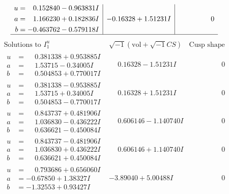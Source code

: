 \documentclass[1p]{elsarticle_modified}
\theoremstyle{definition}
\newcommand{\I}{\sqrt{-1}}
\begin{document}
$$\begin{array}{c|c|c}
\begin{aligned}
u &= \phantom{-}0.152840 - 0.963831 I \\
a &= \phantom{-}1.166230 + 0.182836 I \\
b &= -0.463762 - 0.579118 I\end{aligned}
 & -0.16328 + 1.51231 I & \phantom{-0.000000 } 0\\
 \hline 
 \end{array}$$\newpage$$\begin{array}{c|c|c}  
\text{Solutions to }I^u_{1}& \I (\text{vol} + \sqrt{-1}CS) & \text{Cusp shape}\\
 \hline 
\begin{aligned}
u &= \phantom{-}0.381338 + 0.953885 I \\
a &= \phantom{-}1.53715 - 0.34005 I \\
b &= \phantom{-}0.504853 + 0.770017 I\end{aligned}
 & \phantom{-}0.16328 - 1.51231 I & \phantom{-0.000000 } 0 \\ \hline\begin{aligned}
u &= \phantom{-}0.381338 - 0.953885 I \\
a &= \phantom{-}1.53715 + 0.34005 I \\
b &= \phantom{-}0.504853 - 0.770017 I\end{aligned}
 & \phantom{-}0.16328 + 1.51231 I & \phantom{-0.000000 } 0 \\ \hline\begin{aligned}
u &= \phantom{-}0.843737 + 0.481906 I \\
a &= \phantom{-}1.036830 - 0.436222 I \\
b &= \phantom{-}0.636621 - 0.450084 I\end{aligned}
 & \phantom{-}0.606146 - 1.140740 I & \phantom{-0.000000 } 0 \\ \hline\begin{aligned}
u &= \phantom{-}0.843737 - 0.481906 I \\
a &= \phantom{-}1.036830 + 0.436222 I \\
b &= \phantom{-}0.636621 + 0.450084 I\end{aligned}
 & \phantom{-}0.606146 + 1.140740 I & \phantom{-0.000000 } 0 \\ \hline\begin{aligned}
u &= \phantom{-}0.793686 + 0.656060 I \\
a &= -0.67850 + 1.38327 I \\
b &= -1.32553 + 0.93427 I\end{aligned}
 & -3.89040 + 5.00488 I & \phantom{-0.000000 } 0 \\ \hline\begin{aligned}

\end{aligned}
\end{array}$$
\end{document}
